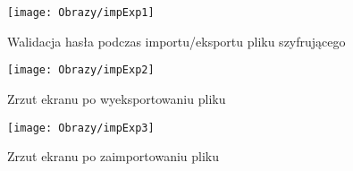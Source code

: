 \begin{enumerate*}
	
	
	\begin{figure}[ht!]
		\begin{minipage}{0.2\textwidth}
			\texttt{[image: Obrazy/impExp1]}
			\caption{Walidacja hasła podczas importu/eksportu pliku szyfrującego }
			\label{rys:impExp1}
		\end{minipage}
		\begin{minipage}{0.2\textwidth}
			\texttt{[image: Obrazy/impExp2]}
			\caption{Zrzut ekranu po wyeksportowaniu pliku }
			\label{rys:impExp2}
		\end{minipage}
		
		\begin{minipage}{0.2\textwidth}
			\texttt{[image: Obrazy/impExp3]}
			\caption{Zrzut ekranu po zaimportowaniu pliku }
			\label{rys:impExp3}
		\end{minipage}
		
		
		
		
	\end{figure}
	
\end{enumerate*}
